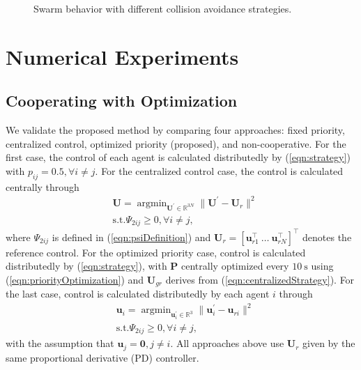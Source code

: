 \documentclass{ifacconf}
\begin{document}
\begin{figure}[t!]
   \caption{Swarm behavior with different collision avoidance strategies.}
   \label{fig:optexp}
\end{figure}

\section{Numerical Experiments}\label{sec:exp}

\subsection{Cooperating with Optimization}
\par We validate the proposed method by comparing four approaches: fixed priority, centralized control, optimized priority (proposed), and non-cooperative.
For the first case, the control of each agent is calculated distributedly by (\ref{eqn:strategy}) with $p_{ij} = 0.5, \forall i \neq j$.
For the centralized control case, the control is calculated centrally through 
\begin{equation}\label{eqn:centralizedStrategy}
\begin{aligned}
      &\boldsymbol{U} = \mathop{\arg \min}_{\boldsymbol{U}^{\prime} \in \mathbb{R}^{3 N}} \| \boldsymbol{U}^\prime - \boldsymbol{U}_r\|^2 \\
      &\mathrm{s.t.}  \Psi_{2ij} \ge 0, \forall i \neq j,
\end{aligned}
\end{equation}
where $\Psi_{2ij}$ is defined in (\ref{eqn:psiDefinition}) and $\boldsymbol{U}_r = [\boldsymbol{u}_{r1}^{\top}~\dots~\boldsymbol{u}_{rN}^{\top}]^\top$ denotes the reference control.
For the optimized priority case, control is calculated distributedly by (\ref{eqn:strategy}), with $\boldsymbol{P}$ centrally optimized every $10~\mathrm{s}$ using (\ref{eqn:priorityOptimization}) and $\boldsymbol{U}_{gr}$ derives from (\ref{eqn:centralizedStrategy}).
For the last case, control is calculated distributedly by each agent $i$ through
\begin{equation}
\begin{aligned}
      & \boldsymbol{u}_i = \mathop{\arg \min}_{\boldsymbol{u}_i^{\prime} \in \mathbb{R}^{3}} \| \boldsymbol{u}_i^\prime - \boldsymbol{u}_{ri}\|^2 \\
      & \mathrm{s.t.}  \Psi_{2ij} \ge 0, \forall i \neq j,
\end{aligned}
\end{equation}
with the assumption that $\boldsymbol{u}_j = \boldsymbol{0}, j \neq i$.  
All approaches above use $\boldsymbol{U}_r$ given by the same proportional derivative (PD) controller.
\end{document}
